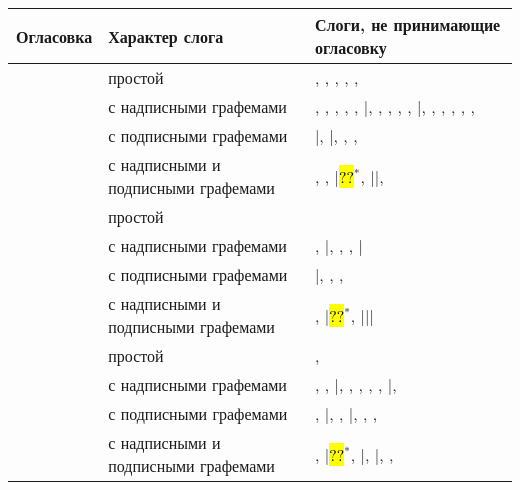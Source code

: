 \begin{tabularx}{\textwidth}{p{} p{} p{}}
	\caption{Слоги, не принимающие огласовку}
	\label{tab:2}\\
		\toprule
	\parbox{0.1\textwidth}{\centering Огла\-совка} & \parbox{0.4\textwidth}{\centering Характер слога} & \parbox{0.4\textwidth}{\centering Слоги, не принимающие огласовку}\\
	\midrule
	\endhead
	\addlinespace
	 & простой & , , , , , \\
	& с надписными графемами & , , , , , |\quad  {}, , , , , |\quad {}, , , , , , \\
	\addlinespace
	& с подписными графемами & |\quad {}, |\quad {}, , , \\
	\addlinespace
	& с надписными и подписными графемами & , , |\quad \hl{??}\hyperref[tab:2:spec1]{$^*$}, |\quad {}|\quad {}, \\ 
	\midrule
	\addlinespace
	 & простой & \\
	& с надписными графемами & , |\quad {}, , , |\quad {}\\
	\addlinespace
	& с подписными графемами & |\quad {}, , , \\
	\addlinespace
	& с надписными и подписными графемами & , |\quad \hl{??}\hyperref[tab:2:spec1]{$^*$}, |\quad {}|\quad {}|\quad {}\\
	\midrule
	\addlinespace
	 & простой & , \\
	& с надписными графемами & , , |\quad {}, , , , , |\quad {}, \\
	\addlinespace
	& с подписными графемами & , |\quad {}, , |\quad {}, , , \\
	\addlinespace
	& с надписными и подписными графемами & , |\quad \hl{??}\hyperref[tab:2:spec1]{$^*$}, |\quad {}, |\quad {}, , \\

\end{tabularx}
